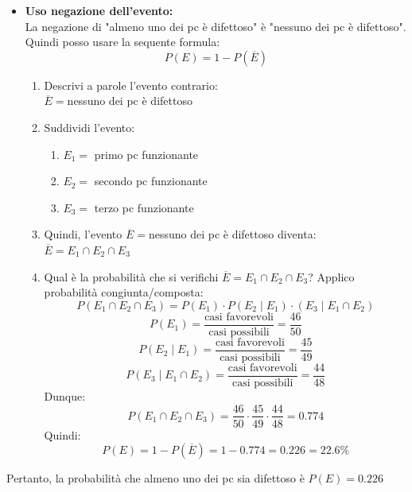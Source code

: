 \documentclass{article}  %
\theoremstyle{definition}
\begin{document}
\begin{esercizio}[Esercizio]
\begin{itemize}
\begin{itemize}
		      \end{itemize}
		      \begin{align*}
			      P(E_1 \cup E_2 \cup E_3)
			       & = [P(E_1) + P(E_2) + P(E_3)] +                        \\
			       & - [P(E_1 \cap E_2)+P(E_1 \cap E_3)+P(E_2 \cap E_3)] + \\
			       & + [P(E_1 \cap E_2 \cap E_3)] =
		      \end{align*}
		      Se avessi tutti i dati, sarebbe facile, ma dato che non li ho è meglio il secondo approccio. \\
		\item \textbf{Uso negazione dell'evento:} \\
		      La negazione di "almeno uno dei pc è difettoso" è "nessuno dei pc è difettoso". Quindi posso usare la sequente formula:
		      \[
			      P(E)=1-P(\overline{E})
		      \]
		      \begin{enumerate}
			      \item Descrivi a parole l'evento contrario: \\ $\overline{E}=$nessuno dei pc è difettoso
			      \item Suddividi l'evento:
			            \begin{enumerate}
				            \item $E_1=$ primo pc funzionante
				            \item $E_2=$ secondo pc funzionante
				            \item $E_3=$ terzo pc funzionante
			            \end{enumerate}
			      \item Quindi, l'evento $\overline{E}=$nessuno dei pc è difettoso diventa: \\ $\overline{E}=E_1 \cap E_2 \cap E_3$
			      \item Qual è la probabilità che si verifichi $\overline{E}=E_1 \cap E_2 \cap E_3$? Applico probabilità congiunta/composta:
			            \[
				            P(E_1 \cap E_2 \cap E_3)=P(E_1)\cdot P(E_2 \mid E_1) \cdot (E_3 \mid E_1 \cap E_2)
			            \]
			            \[
				            P(E_1)=\frac{\text{casi favorevoli}}{\text{casi possibili}}=\frac{46}{50}
			            \]
			            \[
				            P(E_2 \mid E_1)=\frac{\text{casi favorevoli}}{\text{casi possibili}}=\frac{45}{49}
			            \]
			            \[
				            P(E_3 \mid E_1 \cap E_2)=\frac{\text{casi favorevoli}}{\text{casi possibili}}=\frac{44}{48}
			            \]
			            Dunque:
			            \[
				            P(E_1 \cap E_2 \cap E_3)=\frac{46}{50} \cdot \frac{45}{49} \cdot \frac{44}{48}=0.774
			            \]
			            Quindi:
			            \[
				            P(E)=1-P(\overline{E})=1-0.774=0.226=22.6\%
			            \]
		      \end{enumerate}
	\end{itemize}
	Pertanto, la probabilità che almeno uno dei pc sia difettoso è $P(E)=0.226$
\end{esercizio}
\end{document}
